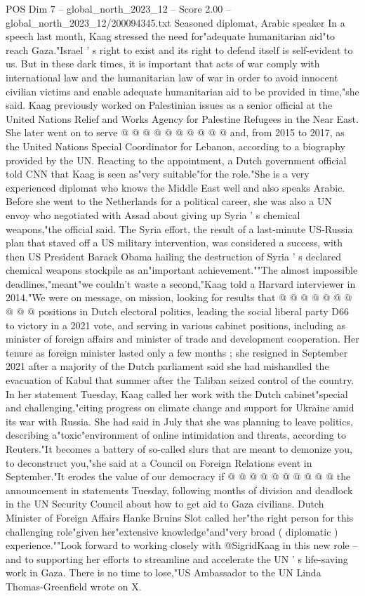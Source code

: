 \begin{textsample}{POS Dim 7 – global\_north\_2023\_12 – Score 2.00 – global\_north\_2023\_12/200094345.txt}
Seasoned diplomat, Arabic speaker In a speech last month, Kaag stressed the need for"adequate humanitarian aid"to reach Gaza."Israel ' s right to exist and its right to defend itself is self-evident to us.
But in these dark times, it is important that acts of war comply with international law and the humanitarian law of war in order to avoid innocent civilian victims and enable adequate humanitarian aid to be provided in time,"she said.
Kaag previously worked on Palestinian issues as a senior official at the United Nations Relief and Works Agency for Palestine Refugees in the Near East.
She later went on to serve @ @ @ @ @ @ @ @ @ @ and, from 2015 to 2017, as the United Nations Special Coordinator for Lebanon, according to a biography provided by the UN.
Reacting to the appointment, a Dutch government official told CNN that Kaag is seen as"very suitable"for the role."She is a very experienced diplomat who knows the Middle East well and also speaks Arabic.
Before she went to the Netherlands for a political career, she was also a UN envoy who negotiated with Assad about giving up Syria ' s chemical weapons,"the official said.
The Syria effort, the result of a last-minute US-Russia plan that staved off a US military intervention, was considered a success, with then US President Barack Obama hailing the destruction of Syria ' s declared chemical weapons stockpile as an"important achievement.""The almost impossible deadlines,"meant"we couldn't waste a second,"Kaag told a Harvard interviewer in 2014."We were on message, on mission, looking for results that @ @ @ @ @ @ @ @ @ @ positions in Dutch electoral politics, leading the social liberal party D66 to victory in a 2021 vote, and serving in various cabinet positions, including as minister of foreign affairs and minister of trade and development cooperation.
Her tenure as foreign minister lasted only a few months ; she resigned in September 2021 after a majority of the Dutch parliament said she had mishandled the evacuation of Kabul that summer after the Taliban seized control of the country.
In her statement Tuesday, Kaag called her work with the Dutch cabinet"special and challenging,"citing progress on climate change and support for Ukraine amid its war with Russia.
She had said in July that she was planning to leave politics, describing a"toxic"environment of online intimidation and threats, according to Reuters."It becomes a battery of so-called slurs that are meant to demonize you, to deconstruct you,"she said at a Council on Foreign Relations event in September."It erodes the value of our democracy if @ @ @ @ @ @ @ @ @ @ the announcement in statements Tuesday, following months of division and deadlock in the UN Security Council about how to get aid to Gaza civilians.
Dutch Minister of Foreign Affairs Hanke Bruins Slot called her"the right person for this challenging role"given her"extensive knowledge"and"very broad ( diplomatic ) experience.""Look forward to working closely with @SigridKaag in this new role -- and to supporting her efforts to streamline and accelerate the UN ' s life-saving work in Gaza.
There is no time to lose,"US Ambassador to the UN Linda Thomas-Greenfield wrote on X.

\end{textsample}
